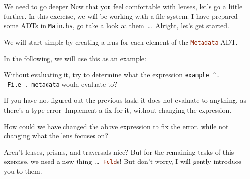 \documentclass{exercise}
\newcommand\h[2][]{\lstinline[language=haskell,#1]{#2}}
\begin{document}
	\begin{exercise}{We need to go deeper}
		Now that you feel comfortable with lenses, let's go a little further. In this
		exercise, we will be working with a file system. I have prepared some ADTs in
		\texttt{Main.hs}, go take a look at them~\ldots~Alright, let's get started.
		\begin{tasks}
			\item We will start simple by creating a lens for each element of the
				\h{Metadata} ADT.
		\end{tasks}
		In the following, we will use this as an example:
		\begin{tasks}[resume*]
			\item Without evaluating it, try to determine what the expression \h{example ^.
				_File . metadata} would evaluate to?
			\item If you have not figured out the previous task: it does not evaluate to
				anything, as there's a type error. Implement a fix for it, without
				changing the expression.
			\item How could we have changed the above expression to fix the error, while
				not changing what the lens focuses on?
		\end{tasks}
		Aren't lenses, prisms, and traversals nice? But for the remaining tasks of this
		exercise, we need a new thing~\ldots~\h{Fold}s! But don't worry, I will gently
		introduce you to them.


\end{exercise}
\end{document}
